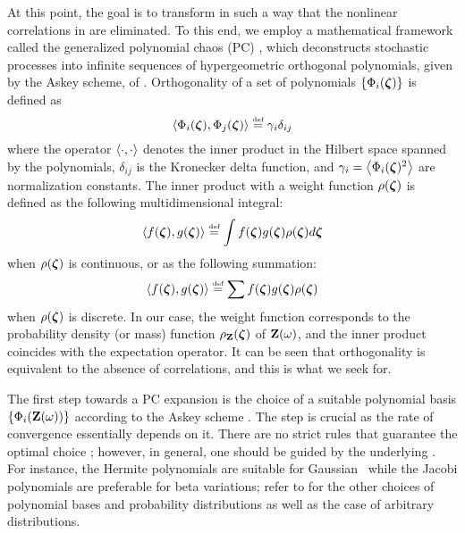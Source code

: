 At this point, the goal is to transform  in such a way that the nonlinear correlations in  are eliminated. To this end, we employ a mathematical framework called the generalized polynomial chaos (PC) \cite{xiu2002}, which deconstructs stochastic processes into infinite sequences of hypergeometric orthogonal polynomials, given by the Askey scheme, of \rvs. Orthogonality of a set of polynomials $\{ \Phi_i(\boldsymbol{\zeta}) \}$ is defined as
\begin{equation} \elabel{orthogonality}
  \oInner{\pcb_i(\vz)}{\pcb_j(\vz)} \eqdef \pcn_i \delta_{ij}
\end{equation}
where the operator $\oInner{\idot}{\idot}$ denotes the inner product in the Hilbert space spanned by the polynomials, $\delta_{ij}$ is the Kronecker delta function, and $\pcn_i = \oInner{\pcb_i(\vz)^2}$ are normalization constants. The inner product with a weight function $\rho(\boldsymbol{\zeta})$ is defined as the following multidimensional integral:
\begin{equation} \elabel{inner-product-integral}
  \oInner{f(\vz)}{g(\vz)} \eqdef \int f(\vz) g(\vz) \PDF(\vz) d\vz
\end{equation}
when $\rho(\boldsymbol{\zeta})$ is continuous, or as the following summation:
\begin{equation} \elabel{inner-product-sum}
  \oInner{f(\vz)}{g(\vz)} \eqdef \sum f(\vz) g(\vz) \PDF(\vz)
\end{equation}
when $\rho(\boldsymbol{\zeta})$ is discrete. In our case, the weight function corresponds to the probability density (or mass) function $\rho_{\mathbf{Z}}(\boldsymbol{\zeta})$ of $\mathbf{Z}(\omega)$, and the inner product coincides with the expectation operator. It can be seen that orthogonality is equivalent to the absence of correlations, and this is what we seek for.

The first step towards a PC expansion is the choice of a suitable polynomial basis $\{ \Phi_i(\mathbf{Z}(\omega)) \}$ according to the Askey scheme \cite{xiu2002}. The step is crucial as the rate of convergence essentially depends on it. There are no strict rules that guarantee the optimal choice \cite{maitre2010, knio2006}; however, in general, one should be guided by the underlying \rvs. For instance, the Hermite polynomials are suitable for Gaussian \rvs\ while the Jacobi polynomials are preferable for beta variations; refer to \cite{xiu2010, xiu2002} for the other choices of polynomial bases and probability distributions as well as the case of arbitrary distributions.

